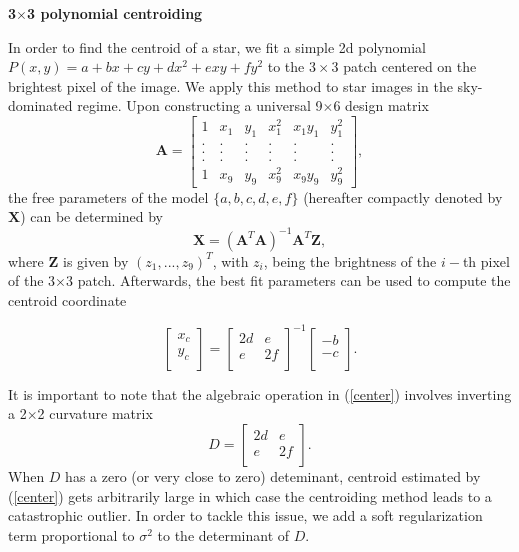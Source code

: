 \documentclass[12pt, preprint]{aastex}
\newcommand{\beq}{\begin{equation}}
\newcommand{\eeq}{\end{equation}}
\begin{document}
\item {\bf 3$\times$3 polynomial centroiding}\quad

In order to find the centroid of a star, 
we fit a simple 2d polynomial $P(x,y)=a+bx+cy+dx^2+exy+fy^2$ to the
$3\times3$ patch centered on the brightest pixel of the
image. We apply this method to star images in the sky-dominated regime.
Upon constructing a universal 9$\times$6 design matrix
\begin{equation}
    \mathbf{A} = 
    \begin{bmatrix}
        1 & x_{1} & y_{1} & x_{1}^{2} & x_{1}y_{1} & y_{1}^{2} \\
        . & . & . & . & . & .  \\
        . & . & . & . & . & .  \\
        . & . & . & . & . & .  \\
        1 & x_{9} & y_{9} & x_{9}^{2} & x_{9}y_{9} & y_{9}^{2}
    \end{bmatrix},
\end{equation}
the free parameters of the model $\{a,b,c,d,e,f\}$
(hereafter compactly denoted by $\mathbf{X}$) can be determined by 
\beq
\mathbf{X} = (\mathbf{A}^{T}\mathbf{A})^{-1}\mathbf{A}^{T}\mathbf{Z},
\label{linearfit}
\eeq
where $\mathbf{Z}$ is given by $(z_{1},...,z_{9})^{T}$,
with $z_{i}$, being the brightness of the $i-$th pixel of the 3$\times$3 patch.
Afterwards, the best fit parameters can be used to compute the centroid coordinate

\beq
  \begin{bmatrix}
      x_{c}\\
      y_{c}\\
  \end{bmatrix} = 
  \begin{bmatrix}
      2d & e\\
      e & 2f\\
  \end{bmatrix}^{-1}
  \begin{bmatrix}
      -b\\
      -c\\
  \end{bmatrix}.
\label{center}
\eeq

It is important to note that the algebraic operation in (\ref{center}) involves 
inverting a 2$\times$2 curvature matrix
\beq
  D = 
  \begin{bmatrix}
      2d & e\\
      e & 2f\\
  \end{bmatrix}.
\eeq
When $D$ has a zero (or very close to zero) deteminant,
centroid estimated by (\ref{center}) gets arbitrarily 
large in which case the centroiding method leads to a catastrophic 
outlier. In order to tackle this issue, we add a soft regularization term
proportional to $\sigma^{2}$ to the determinant of $D$.
\end{document}

